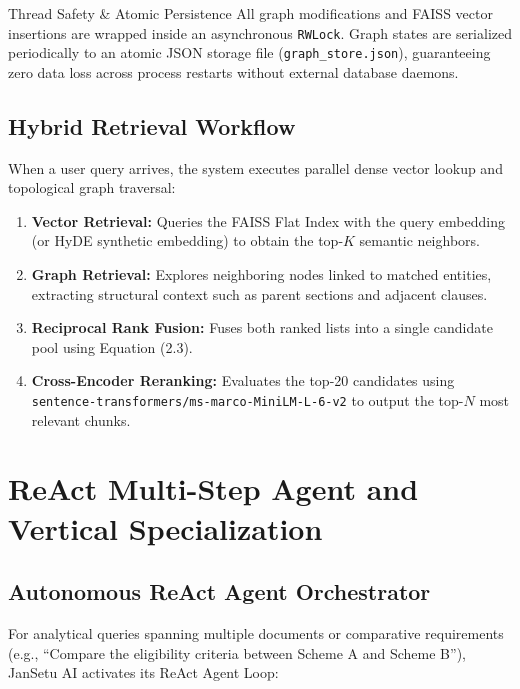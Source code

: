 \documentclass[12pt,a4paper,oneside]{report}
\begin{document}
\begin{infobox}{Thread Safety \& Atomic Persistence}
All graph modifications and FAISS vector insertions are wrapped inside an asynchronous \texttt{RWLock}. Graph states are serialized periodically to an atomic JSON storage file (\texttt{graph\_store.json}), guaranteeing zero data loss across process restarts without external database daemons.
\end{infobox}

\section{Hybrid Retrieval Workflow}
When a user query arrives, the system executes parallel dense vector lookup and topological graph traversal:
\begin{enumerate}[itemsep=3pt]
    \item \textbf{Vector Retrieval:} Queries the FAISS Flat Index with the query embedding (or HyDE synthetic embedding) to obtain the top-$K$ semantic neighbors.
    \item \textbf{Graph Retrieval:} Explores neighboring nodes linked to matched entities, extracting structural context such as parent sections and adjacent clauses.
    \item \textbf{Reciprocal Rank Fusion:} Fuses both ranked lists into a single candidate pool using Equation (2.3).
    \item \textbf{Cross-Encoder Reranking:} Evaluates the top-20 candidates using \texttt{sentence-transformers/ms-marco-MiniLM-L-6-v2} to output the top-$N$ most relevant chunks.
\end{enumerate}

\newpage

\chapter{ReAct Multi-Step Agent and Vertical Specialization}

\section{Autonomous ReAct Agent Orchestrator}
For analytical queries spanning multiple documents or comparative requirements (e.g., ``Compare the eligibility criteria between Scheme A and Scheme B''), JanSetu AI activates its ReAct Agent Loop:
\end{document}
